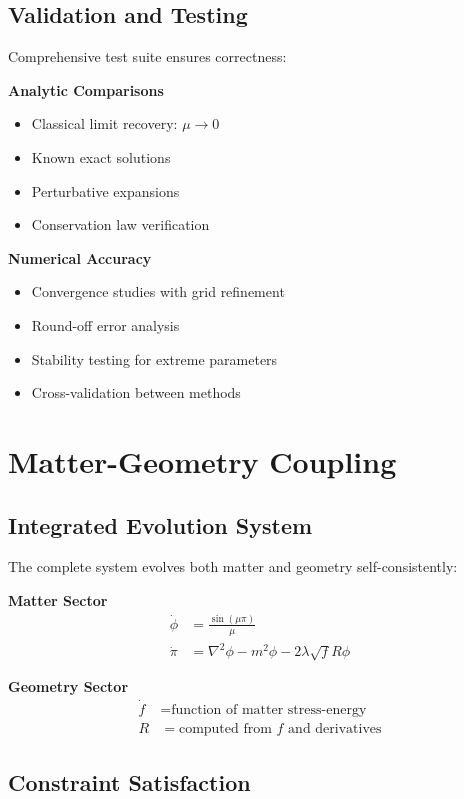 \documentclass[11pt]{article}
\begin{document}
\subsection{Validation and Testing}

Comprehensive test suite ensures correctness:

\textbf{Analytic Comparisons}
\begin{itemize}
\item Classical limit recovery: $\mu \to 0$
\item Known exact solutions
\item Perturbative expansions
\item Conservation law verification
\end{itemize}

\textbf{Numerical Accuracy}
\begin{itemize}
\item Convergence studies with grid refinement
\item Round-off error analysis
\item Stability testing for extreme parameters
\item Cross-validation between methods
\end{itemize}

\section{Matter-Geometry Coupling}

\subsection{Integrated Evolution System}

The complete system evolves both matter and geometry self-consistently:

\textbf{Matter Sector}
\begin{align}
\dot{\phi} &= \frac{\sin(\mu\pi)}{\mu} \\
\dot{\pi} &= \nabla^2\phi - m^2\phi - 2\lambda\sqrt{f}R\phi
\end{align}

\textbf{Geometry Sector}
\begin{align}
\dot{f} &= \text{function of matter stress-energy} \\
R &= \text{computed from } f \text{ and derivatives}
\end{align}

\subsection{Constraint Satisfaction}
\end{document}

